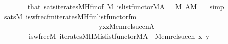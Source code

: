 \begin{isabellebody}
\ \ \ \ \ \ \isamarkupfalse%
\ that\ sats{\isacharunderscore}{\kern0pt}iterates{\isacharunderscore}{\kern0pt}MH{\isacharunderscore}{\kern0pt}fm{\isacharbrackleft}{\kern0pt}of\ M\ {\isachardoublequoteopen}is{\isacharunderscore}{\kern0pt}list{\isacharunderscore}{\kern0pt}functor{\isacharparenleft}{\kern0pt}{\isacharhash}{\kern0pt}{\isacharhash}{\kern0pt}M{\isacharcomma}{\kern0pt}A{\isacharparenright}{\kern0pt}{\isachardoublequoteclose}\ {\isacharunderscore}{\kern0pt}{\isacharbrackright}{\kern0pt}\ {}\ {\isacartoucheopen}{}{\isasymin}M{\isacartoucheclose}\ {\isacartoucheopen}A{\isasymin}M{\isacartoucheclose}\ \ \isamarkupfalse%
\ simp\isanewline
\ \ \ \ \isamarkupfalse%
\ \isamarkupfalse%
\ {}{\isacharcolon}{\kern0pt}{\isachardoublequoteopen}sats{\isacharparenleft}{\kern0pt}M{\isacharcomma}{\kern0pt}\ is{\isacharunderscore}{\kern0pt}wfrec{\isacharunderscore}{\kern0pt}fm{\isacharparenleft}{\kern0pt}iterates{\isacharunderscore}{\kern0pt}MH{\isacharunderscore}{\kern0pt}fm{\isacharparenleft}{\kern0pt}list{\isacharunderscore}{\kern0pt}functor{\isacharunderscore}{\kern0pt}fm{\isacharparenleft}{\kern0pt}{}{}{\isacharcomma}{\kern0pt}{}{\isacharcomma}{\kern0pt}{}{\isacharparenright}{\kern0pt}{\isacharcomma}{\kern0pt}{}{}{\isacharcomma}{\kern0pt}{}{\isacharcomma}{\kern0pt}{}{\isacharcomma}{\kern0pt}{}{\isacharparenright}{\kern0pt}{\isacharcomma}{\kern0pt}{}{\isacharcomma}{\kern0pt}{}{\isacharcomma}{\kern0pt}{}{\isacharparenright}{\kern0pt}{\isacharcomma}{\kern0pt}\isanewline
\ \ \ \ \ \ \ \ \ \ \ \ \ \ \ \ \ \ \ \ \ \ \ \ \ \ \ \ {\isacharbrackleft}{\kern0pt}y{\isacharcomma}{\kern0pt}x{\isacharcomma}{\kern0pt}z{\isacharcomma}{\kern0pt}Memrel{\isacharparenleft}{\kern0pt}succ{\isacharparenleft}{\kern0pt}n{\isacharparenright}{\kern0pt}{\isacharparenright}{\kern0pt}{\isacharcomma}{\kern0pt}A{\isacharcomma}{\kern0pt}{}{\isacharbrackright}{\kern0pt}{\isacharparenright}{\kern0pt}\isanewline
\ \ \ \ \ \ \ \ {\isasymlongleftrightarrow}\isanewline
\ \ \ \ \ \ \ \ is{\isacharunderscore}{\kern0pt}wfrec{\isacharparenleft}{\kern0pt}{\isacharhash}{\kern0pt}{\isacharhash}{\kern0pt}M{\isacharcomma}{\kern0pt}\ iterates{\isacharunderscore}{\kern0pt}MH{\isacharparenleft}{\kern0pt}{\isacharhash}{\kern0pt}{\isacharhash}{\kern0pt}M{\isacharcomma}{\kern0pt}is{\isacharunderscore}{\kern0pt}list{\isacharunderscore}{\kern0pt}functor{\isacharparenleft}{\kern0pt}{\isacharhash}{\kern0pt}{\isacharhash}{\kern0pt}M{\isacharcomma}{\kern0pt}A{\isacharparenright}{\kern0pt}{\isacharcomma}{\kern0pt}{}{\isacharparenright}{\kern0pt}\ {\isacharcomma}{\kern0pt}\ Memrel{\isacharparenleft}{\kern0pt}succ{\isacharparenleft}{\kern0pt}n{\isacharparenright}{\kern0pt}{\isacharparenright}{\kern0pt}{\isacharcomma}{\kern0pt}\ x{\isacharcomma}{\kern0pt}\ y{\isacharparenright}{\kern0pt}{\isachardoublequoteclose}\isanewline

\end{isabellebody}
